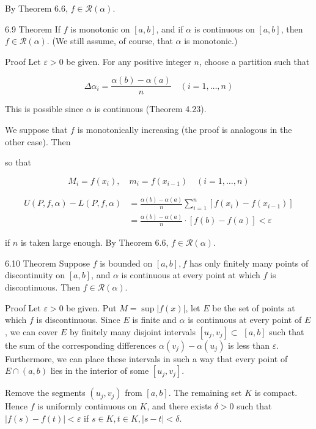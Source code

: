 \documentclass[10pt]{article}
\begin{document}
By Theorem 6.6, $f \in \mathscr{R}(\alpha)$.

6.9 Theorem If $f$ is monotonic on $[a, b]$, and if $\alpha$ is continuous on $[a, b]$, then $f \in \mathscr{R}(\alpha)$. (We still assume, of course, that $\alpha$ is monotonic.)

Proof Let $\varepsilon>0$ be given. For any positive integer $n$, choose a partition such that

$$
\Delta \alpha_{i}=\frac{\alpha(b)-\alpha(a)}{n} \quad(i=1, \ldots, n)
$$

This is possible since $\alpha$ is continuous (Theorem 4.23).

We suppose that $f$ is monotonically increasing (the proof is analogous in the other case). Then

so that

$$
M_{i}=f\left(x_{i}\right), \quad m_{i}=f\left(x_{i-1}\right) \quad(i=1, \ldots, n)
$$

$$
\begin{aligned}
U(P, f, \alpha)-L(P, f, \alpha) & =\frac{\alpha(b)-\alpha(a)}{n} \sum_{i=1}^{n}\left[f\left(x_{i}\right)-f\left(x_{i-1}\right)\right] \\
& =\frac{\alpha(b)-\alpha(a)}{n} \cdot[f(b)-f(a)]<\varepsilon
\end{aligned}
$$

if $n$ is taken large enough. By Theorem 6.6, $f \in \mathscr{R}(\alpha)$.

6.10 Theorem Suppose $f$ is bounded on $[a, b], f$ has only finitely many points of discontinuity on $[a, b]$, and $\alpha$ is continuous at every point at which $f$ is discontinuous. Then $f \in \mathscr{R}(\alpha)$.

Proof Let $\varepsilon>0$ be given. Put $M=\sup |f(x)|$, let $E$ be the set of points at which $f$ is discontinuous. Since $E$ is finite and $\alpha$ is continuous at every point of $E$, we can cover $E$ by finitely many disjoint intervals $\left[u_{j}, v_{j}\right] \subset$ $[a, b]$ such that the sum of the corresponding differences $\alpha\left(v_{j}\right)-\alpha\left(u_{j}\right)$ is less than $\varepsilon$. Furthermore, we can place these intervals in such a way that every point of $E \cap(a, b)$ lies in the interior of some $\left[u_{j}, v_{j}\right]$.

Remove the segments $\left(u_{j}, v_{j}\right)$ from $[a, b]$. The remaining set $K$ is compact. Hence $f$ is uniformly continuous on $K$, and there exists $\delta>0$ such that $|f(s)-f(t)|<\varepsilon$ if $s \in K, t \in K,|s-t|<\delta$.
\end{document}
